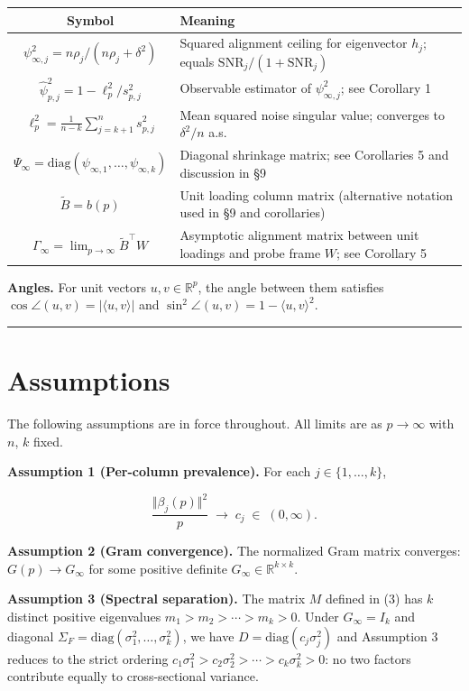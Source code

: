 \documentclass{article}
\theoremstyle{remark}
\begin{document}
\begin{center}
\begin{tabular}{|c|l|}
\hline
Symbol & Meaning \\
\hline
$\psi_{\infty,j}^2 = n\rho_j/(n\rho_j+\delta^2)$ & Squared alignment ceiling for eigenvector $h_j$; equals $\mathrm{SNR}_j/(1+\mathrm{SNR}_j)$ \\
\hline
$\hat{\psi}_{p,j}^2 = 1 - \ell_p^2/s_{p,j}^2$ & Observable estimator of $\psi_{\infty,j}^2$; see Corollary 1 \\
\hline
$\ell_p^2 = \frac{1}{n-k}\sum_{j=k+1}^n s_{p,j}^2$ & Mean squared noise singular value; converges to $\delta^2/n$ a.s. \\
\hline
$\Psi_\infty = \mathrm{diag}(\psi_{\infty,1},\ldots,\psi_{\infty,k})$ & Diagonal shrinkage matrix; see Corollaries 5 and discussion in §9 \\
\hline
$\tilde{B} = b(p)$ & Unit loading column matrix (alternative notation used in §9 and corollaries) \\
\hline
$\Gamma_\infty = \lim_{p\to\infty}\tilde{B}^\top W$ & Asymptotic alignment matrix between unit loadings and probe frame $W$; see Corollary 5 \\
\hline
\end{tabular}
\end{center}

\textbf{Angles.} For unit vectors $u,v\in\mathbb{R}^p$, the angle between them satisfies $\cos\angle(u,v) = |\langle u,v\rangle|$ and $\sin^2\angle(u,v) = 1 - \langle u,v\rangle^2$.

\medskip\noindent\rule{\linewidth}{0.4pt}\medskip

\section{Assumptions}

The following assumptions are in force throughout. All limits are as $p\to\infty$ with $n$, $k$ fixed.

\textbf{Assumption 1 (Per-column prevalence).} For each $j\in\{1,\ldots,k\}$,

\[
\frac{\Vert \beta_j(p)\Vert^2}{p} \;\longrightarrow\; c_j \;\in\; (0,\infty).
\]

\textbf{Assumption 2 (Gram convergence).} The normalized Gram matrix converges: $G(p)\to G_\infty$ for some positive definite $G_\infty\in\mathbb{R}^{k\times k}$.

\textbf{Assumption 3 (Spectral separation).} The matrix $M$ defined in (3) has $k$ distinct positive eigenvalues $m_1 > m_2 > \cdots > m_k > 0$. Under $G_\infty = I_k$ and diagonal $\Sigma_F = \mathrm{diag}(\sigma_1^2,\ldots,\sigma_k^2)$, we have $D = \mathrm{diag}(c_j\sigma_j^2)$ and Assumption 3 reduces to the strict ordering $c_1\sigma_1^2 > c_2\sigma_2^2 > \cdots > c_k\sigma_k^2 > 0$: no two factors contribute equally to cross-sectional variance.
\end{document}
